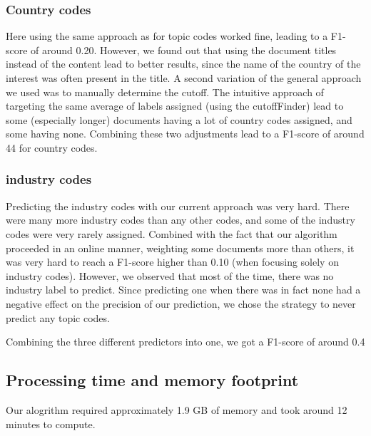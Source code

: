 \documentclass{article}
\begin{document}
            \subsubsection{ Country codes }
                Here using the same approach as for topic codes worked fine, leading to a F1-score of around 0.20. However, we found out that using the document titles instead of the content lead to better results, since the name of the country of the interest was often present in the title. A second variation of the general approach we used was to manually determine the cutoff. The intuitive approach of targeting the same average of labels assigned (using the cutoffFinder) lead to some (especially longer) documents having a lot of country codes assigned, and some having none.
                    Combining these two adjustments lead to a F1-score of around 44 for country codes.


            \subsubsection{industry codes }
            Predicting the industry codes with our current approach was very hard. There were many more industry codes than any other codes, and some of the industry codes were very rarely assigned.  Combined with the fact that our algorithm proceeded in an online manner, weighting some documents more than others, it was very hard to reach a F1-score higher than 0.10 (when focusing solely on industry codes). However, we observed that most of the time, there was no industry label to predict. Since predicting one when there was in fact none had a negative effect on the precision of our prediction, we chose the strategy to never predict any topic codes.

            Combining the three different predictors into one, we got a F1-score of around 0.4

    \subsection{Processing time and memory footprint}
        Our alogrithm required approximately 1.9 GB of memory and took around 12 minutes to compute.
\end{document}
